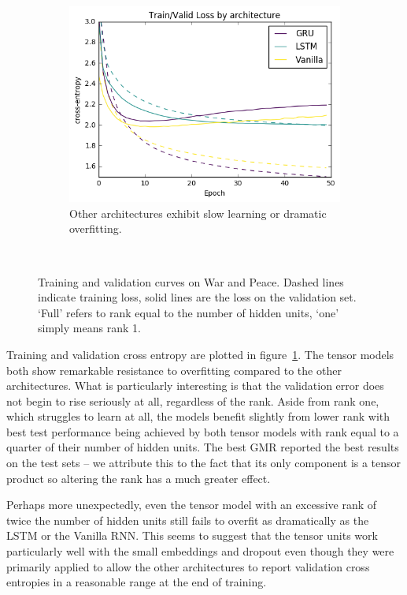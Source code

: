 \begin{figure}
\begin{subfigure}[t]{0.3\textwidth}
	\includegraphics[width=\textwidth]{exps/wp/others}
	\caption[War and Peace, other architectures]
	{Other architectures exhibit slow learning or dramatic overfitting.}
\end{subfigure}~
\caption[War and Peace, training curves]
		{Training and validation curves on War and Peace. 
		 Dashed lines indicate training loss, solid lines are the loss on the validation set.
		 `Full' refers to rank equal to the number of hidden units, `one' simply means rank 1.}
\label{fig:wp}
\end{figure}

Training and validation cross entropy are plotted in figure~\ref{fig:wp}. 
The tensor models both
show remarkable resistance to overfitting compared to the other architectures. What is particularly
interesting is that the validation error does not begin to rise seriously at all, regardless of the
rank. Aside from rank one, which struggles to learn at all, the models benefit slightly from lower
rank with best test performance being achieved by both tensor models with rank equal to a quarter
of their number of hidden units. The best GMR reported the best results on the test sets -- we
attribute this to the fact that its only component is a tensor product so altering the rank has
a much greater effect.

Perhaps more unexpectedly, even the tensor model with an excessive rank of twice the number of hidden
units still fails to overfit as dramatically as the LSTM or the Vanilla RNN. This seems to suggest that
the tensor units work particularly well with the small embeddings and dropout even though they were primarily
applied to allow the other architectures to report validation cross entropies in a reasonable range
at the end of training.

